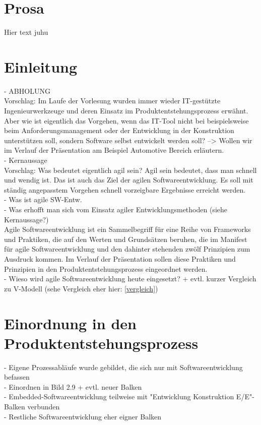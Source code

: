 \section{Prosa}\label{prosa}
Hier text juhu

\section{Einleitung}
- ABHOLUNG\\
Vorschlag: Im Laufe der Vorlesung wurden immer wieder IT-gestützte Ingenieurwerkzeuge und deren Einsatz im Produktentstehungsprozess erwähnt. \cite{Daberkow2022} Aber wie ist eigentlich das Vorgehen, wenn das IT-Tool nicht bei beispielsweise beim Anforderungsmanagement oder der Entwicklung in der Konstruktion unterstützen soll, sondern Software selbst entwickelt werden soll? --> Wollen wir im Verlauf der Präsentation am Beispiel Automotive Bereich erläutern. \\
- Kernaussage\\
Vorschlag: Was bedeutet eigentlich agil sein? Agil sein bedeutet, dass man schnell und wendig ist. Das ist auch das Ziel der agilen Softwareentwicklung. Es soll mit ständig angepasstem Vorgehen schnell vorzeigbare Ergebnisse erreicht werden. \cite{wolf2011agile}\\
- Was ist agile SW-Entw.\\
- Was erhofft man sich vom Einsatz agiler Entwicklungsmethoden (siehe Kernaussage?)\\
\glqq Agile Softwareentwicklung ist ein Sammelbegriff für eine Reihe von Frameworks und Praktiken, die auf den Werten und Grundsätzen beruhen, die im Manifest für agile Softwareentwicklung und den dahinter stehenden zwölf Prinzipien zum Ausdruck kommen.\grqq \cite{agile101} Im Verlauf der Präsentation sollen diese Praktiken und Prinzipien in den Produktentstehungsprozess eingeordnet werden. \\
- Wieso wird agile Softwareentwicklung heute eingesetzt? + evtl. kurzer Vergleich zu V-Modell (sehe Vergleich eher hier: \ref{vergleich})\\ 

\section{Einordnung in den Produktentstehungsprozess}
- Eigene Prozessabläufe wurde gebildet, die sich nur mit Softwareentwicklung befassen\\
- Einordnen in Bild 2.9 + evtl. neuer Balken\\
- Embedded-Softwareentwicklung teilweise mit "Entwicklung Konstruktion E/E"-Balken verbunden\\
- Restliche Softwareentwicklung eher eigner Balken\\
